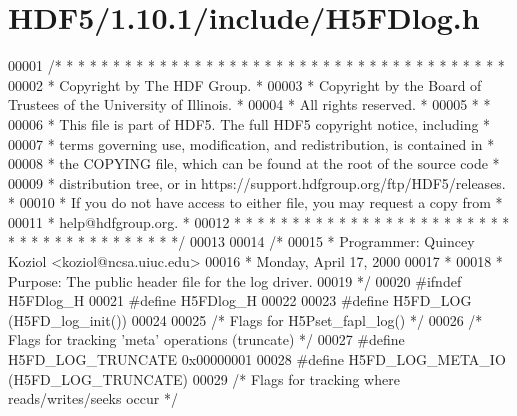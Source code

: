 \hypertarget{_h_d_f5_21_810_81_2include_2_h5_f_dlog_8h_source}{}\section{H\+D\+F5/1.10.1/include/\+H5\+F\+Dlog.h}
\label{_h_d_f5_21_810_81_2include_2_h5_f_dlog_8h_source}

\begin{DoxyCode}
00001 \textcolor{comment}{/* * * * * * * * * * * * * * * * * * * * * * * * * * * * * * * * * * * * * * *}
00002 \textcolor{comment}{ * Copyright by The HDF Group.                                               *}
00003 \textcolor{comment}{ * Copyright by the Board of Trustees of the University of Illinois.         *}
00004 \textcolor{comment}{ * All rights reserved.                                                      *}
00005 \textcolor{comment}{ *                                                                           *}
00006 \textcolor{comment}{ * This file is part of HDF5.  The full HDF5 copyright notice, including     *}
00007 \textcolor{comment}{ * terms governing use, modification, and redistribution, is contained in    *}
00008 \textcolor{comment}{ * the COPYING file, which can be found at the root of the source code       *}
00009 \textcolor{comment}{ * distribution tree, or in https://support.hdfgroup.org/ftp/HDF5/releases.  *}
00010 \textcolor{comment}{ * If you do not have access to either file, you may request a copy from     *}
00011 \textcolor{comment}{ * help@hdfgroup.org.                                                        *}
00012 \textcolor{comment}{ * * * * * * * * * * * * * * * * * * * * * * * * * * * * * * * * * * * * * * */}
00013 
00014 \textcolor{comment}{/*}
00015 \textcolor{comment}{ * Programmer:  Quincey Koziol <koziol@ncsa.uiuc.edu>}
00016 \textcolor{comment}{ *              Monday, April 17, 2000}
00017 \textcolor{comment}{ *}
00018 \textcolor{comment}{ * Purpose: The public header file for the log driver.}
00019 \textcolor{comment}{ */}
00020 \textcolor{preprocessor}{#ifndef H5FDlog\_H}
00021 \textcolor{preprocessor}{#define H5FDlog\_H}
00022 
00023 \textcolor{preprocessor}{#define H5FD\_LOG    (H5FD\_log\_init())}
00024 
00025 \textcolor{comment}{/* Flags for H5Pset\_fapl\_log() */}
00026 \textcolor{comment}{/* Flags for tracking 'meta' operations (truncate) */}
00027 \textcolor{preprocessor}{#define H5FD\_LOG\_TRUNCATE   0x00000001}
00028 \textcolor{preprocessor}{#define H5FD\_LOG\_META\_IO    (H5FD\_LOG\_TRUNCATE)}
00029 \textcolor{comment}{/* Flags for tracking where reads/writes/seeks occur */}

\end{DoxyCode}
